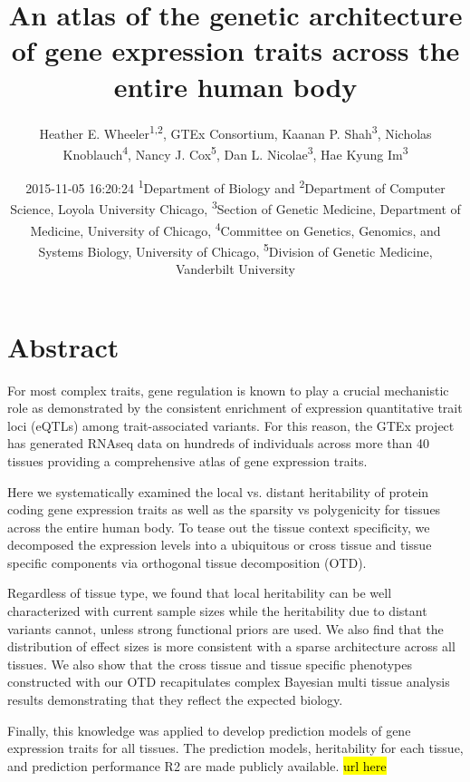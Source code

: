 \documentclass[]{article}
\title{An atlas of the genetic architecture of gene expression traits across the entire human body}
\author{Heather E. Wheeler\textsuperscript{1,2}, GTEx Consortium, Kaanan P.
Shah\textsuperscript{3}, Nicholas Knoblauch\textsuperscript{4}, Nancy J.
Cox\textsuperscript{5}, Dan L. Nicolae\textsuperscript{3}, Hae Kyung
Im\textsuperscript{3}}
\date{2015-11-05 16:20:24 \textsuperscript{1}Department of Biology and
\textsuperscript{2}Department of Computer Science, Loyola University
Chicago, \textsuperscript{3}Section of Genetic Medicine, Department of
Medicine, University of Chicago, \textsuperscript{4}Committee on
Genetics, Genomics, and Systems Biology, University of Chicago,
\textsuperscript{5}Division of Genetic Medicine, Vanderbilt University}
\begin{document}
\maketitle


\section{Abstract}\label{abstract}

For most complex traits, gene regulation is known to play a crucial
mechanistic role as demonstrated by the consistent enrichment of expression
quantitative trait loci (eQTLs) among trait-associated variants. 
For this reason, the GTEx project has generated RNAseq data on hundreds of
individuals across more than 40 tissues providing a comprehensive atlas of gene expression traits.

Here we systematically examined the local vs. distant heritability of protein coding gene expression traits
as well as the sparsity vs polygenicity for tissues across the entire human body. To tease out the 
tissue context specificity, we decomposed the expression levels into a ubiquitous or cross tissue 
and tissue specific components via orthogonal tissue decomposition (OTD).

Regardless of tissue type, we found that local heritability can be well characterized with current sample
sizes while the heritability due to distant variants cannot, unless strong functional priors are used. 
We also find that the distribution of effect sizes is more consistent with a sparse architecture across all tissues.
We also show that the cross tissue and tissue specific phenotypes constructed with our OTD recapitulates 
complex Bayesian multi tissue analysis results demonstrating that they reflect the expected biology.

Finally, this knowledge was applied to develop prediction models of gene expression traits for all tissues. 
The prediction models, heritability for each tissue, and prediction performance R2 are made publicly available. \hl{url here}


\end{document}
